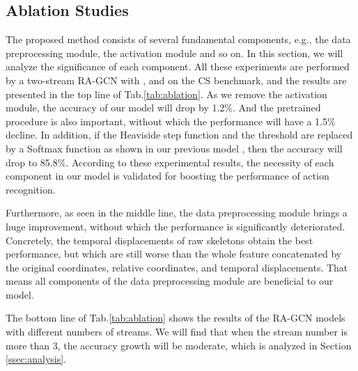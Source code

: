 \documentclass[journal]{IEEEtran}
\begin{document}
\subsection{Ablation Studies}
\label{ssec:ablation}

The proposed method consists of several fundamental components, e.g., the data preprocessing module, the activation module and so on. In this section, we will analyze the significance of each component. All these experiments are performed by a two-stream RA-GCN with ,  and  on the CS benchmark, and the results are presented in the top line of Tab.\ref{tab:ablation}. As we remove the activation module, the accuracy of our model will drop by 1.2\%. And the pretrained procedure is also important, without which the performance will have a 1.5\% decline. In addition, if the Heaviside step function  and the threshold  are replaced by a Softmax function as shown in our previous model \cite{song2019richly}, then the accuracy will drop to 85.8\%. According to these experimental results, the necessity of each component in our model is validated for boosting the performance of action recognition.

Furthermore, as seen in the middle line, the data preprocessing module brings a huge improvement, without which the performance is significantly deteriorated. Concretely, the temporal displacements of raw skeletons obtain the best performance, but which are still worse than the whole feature concatenated by the original coordinates, relative coordinates, and temporal displacements. That means all components of the data preprocessing module are beneficial to our model.

The bottom line of Tab.\ref{tab:ablation} shows the results of the RA-GCN models with different numbers of streams. We will find that when the stream number is more than 3, the accuracy growth will be moderate, which is analyzed in Section \ref{ssec:analysis}.
\end{document}
